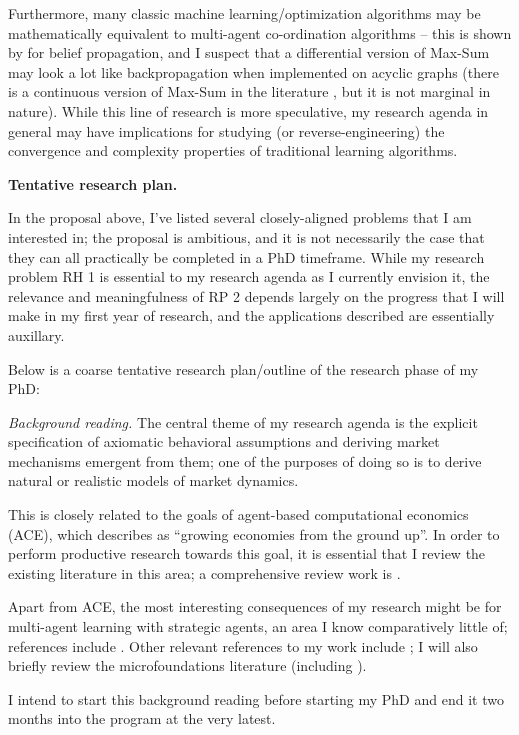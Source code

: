 \documentclass{article}
\newcommand{\statement}[1]{\par\medskip
  {\textbf{#1.}}\space
}
\newcommand{\substatement}[1]{\par\medskip
  {\emph{#1.}}\space
}
\begin{document}
Furthermore, many classic machine learning/optimization algorithms may be mathematically equivalent to multi-agent co-ordination algorithms -- this is shown by \cite{bayati1, bayati2, bayati3} for belief propagation, and I suspect that a differential version of Max-Sum may look a lot like backpropagation when implemented on acyclic graphs (there is a continuous version of Max-Sum in the literature \cite{soton}, but it is not marginal in nature). While this line of research is more speculative, my research agenda in general may have implications for studying (or reverse-engineering) the convergence and complexity properties of traditional learning algorithms.

\statement{Tentative research plan}

In the proposal above, I've listed several closely-aligned problems that I am interested in; the proposal is ambitious, and it is not necessarily the case that they can all practically be completed in a PhD timeframe. While my research problem RH 1 is essential to my research agenda as I currently envision it, the relevance and meaningfulness of RP 2 depends largely on the progress that I will make in my first year of research, and the applications described are essentially auxillary.

Below is a coarse tentative research plan/outline of the research phase of my PhD:

\substatement{Background reading} The central theme of my research agenda is the explicit specification of axiomatic behavioral assumptions and deriving market mechanisms emergent from them; one of the purposes of doing so is to derive natural or realistic models of market dynamics.

This is closely related to the goals of agent-based computational economics (ACE), which \cite{tesfatsion} describes as ``growing economies from the ground up''. In order to perform productive research towards this goal, it is essential that I review the existing literature in this area; a comprehensive review work is \cite{hce:32}. 

Apart from ACE, the most interesting consequences of my research might be for multi-agent learning with strategic agents, an area I know comparatively little of; references include \cite{zhang, canese, calliess}. Other relevant references to my work include \cite{agt:5, bayati1, bayati2, bayati3, garden}; I will also briefly review the microfoundations literature (including \cite{growth, cycles}). 

I intend to start this background reading before starting my PhD and end it two months into the program at the very latest.
\end{document}

